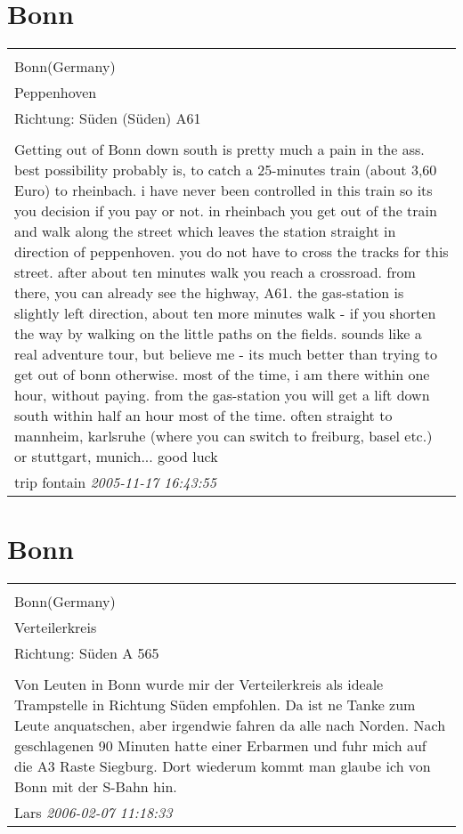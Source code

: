 \documentclass[a4paper,12pt]{article}
\begin{document}
\section{Bonn}
\begin{tabular}{|p{13cm}|}
\hline\\
Bonn(Germany)\\
Peppenhoven\\
Richtung: Süden (Süden) A61 \\
\hline\\
Getting out of Bonn down south is pretty much a pain in the ass. best possibility probably is, to catch a 25-minutes train (about 3,60 Euro) to rheinbach. i have never been controlled in this train so its you decision if you pay or not. in rheinbach you get out of the train and walk along the street which leaves the station straight in direction of peppenhoven. you do not have to cross the tracks for this street. after about ten minutes walk you reach a crossroad. from there, you can already see the highway, A61. the gas-station is slightly left direction, about ten more minutes walk - if you shorten the way by walking on the little paths on the fields. sounds like a real adventure tour, but believe me - its much better than trying to get out of bonn otherwise. most of the time, i am there within one hour, without paying. from the gas-station you will get a lift down south within half an hour most of the time. often straight to mannheim, karlsruhe (where you can switch to freiburg, basel etc.) or stuttgart, munich... good luck \\
trip fontain \textit{ 2005-11-17 16:43:55 }\\\hline
\end{tabular}


\section{Bonn}
\begin{tabular}{|p{13cm}|}
\hline\\
Bonn(Germany)\\
Verteilerkreis\\
Richtung: Süden A 565 \\
\hline\\
Von Leuten in Bonn wurde mir der Verteilerkreis als ideale Trampstelle in Richtung Süden empfohlen. Da ist ne Tanke zum Leute anquatschen, aber irgendwie fahren da alle nach Norden. Nach geschlagenen 90 Minuten hatte einer Erbarmen und fuhr mich auf die A3 Raste Siegburg.
Dort wiederum kommt man glaube ich von Bonn mit der S-Bahn hin. \\
Lars \textit{ 2006-02-07 11:18:33 }\\\hline
\end{tabular}
\end{document}
